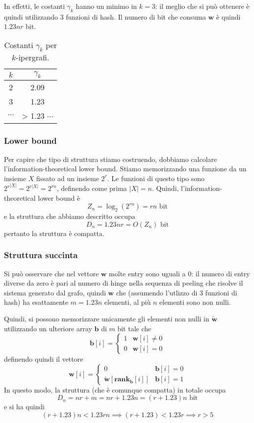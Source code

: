 In effetti, le costanti $\gamma_k$ hanno un minimo in $k = 3$: il meglio che si può 
ottenere è quindi utilizzando $3$ funzioni di hash. Il numero di bit che consuma 
$\mathbf{w}$ è quindi $1.23nr$ bit.  

\begin{table}[htpb]
    \centering
    \begin{tabular}{c|c}
	 $k$ &  $\gamma_k$ \\ 
	 \hline 
	 2 & 2.09 \\
	 3 & 1.23 \\
	 $\cdots$ & > 1.23 $\cdots$
    \end{tabular}
    \caption{Costanti $\gamma_k$ per $k$-ipergrafi.}
    \label{tab:gamma_k_hypergraph}
\end{table}

\subsubsection{Lower bound}
Per capire che tipo di struttura stiamo costruendo, dobbiamo calcolare l'information-theoretical 
lower bound. Stiamo memorizzando una funzione da un insieme $X$ fissato ad un insieme $2^r$.  
Le funzioni di questo tipo sono ${2^{r}}^{|X|} = 2^{r|X|} = 2^{rn}$, definendo come prima $|X| = n$. 
Quindi, l'information-theoretical lower bound è 
$$
Z_n = \log_2(2^{rn}) = rn \text{ bit}
$$
e la struttura che abbiamo descritto occupa 
$$
D_n = 1.23nr = O(Z_n) \text{ bit}
$$
pertanto la struttura è compatta.

\subsubsection{Struttura succinta}
Si può osservare che nel vettore $\mathbf{w}$ molte entry sono uguali a $0$: il numero 
di entry diverse da zero è pari al numero di hinge nella sequenza di peeling 
che risolve il sistema generato dal grafo, quindi $\mathbf{w}$ che (assumendo 
l'utlizzo di $3$ funzioni di hash) ha esattamente $m = 1.23n$ elementi, al più
$n$ elementi sono non nulli. 

Quindi, si possono memorizzare unicamente gli elementi non nulli in $\tilde{\mathbf{w}}$ 
utilizzando un ulteriore array $\mathbf{b}$ di $m$ bit tale che 
$$
\mathbf{b}[i] = \begin{cases}
    1 & \mathbf{w}[i] \neq 0 \\
    0 & \mathbf{w}[i] = 0
\end{cases}
$$
definendo quindi il vettore 
$$
\mathbf{w}[i] = \begin{cases}
    0 & \mathbf{b}[i] = 0 \\
    \tilde{\mathbf{w}}[\mathbf{rank_b}[i]] & \mathbf{b}[i] = 1
\end{cases}
$$
In questo modo, la struttura (che è comunque compatta) in totale occupa 
$$
D_n = nr + m = nr + 1.23n = (r + 1.23) n \text{ bit}
$$
e si ha quindi 
$$
(r + 1.23 ) n < 1.23rn \implies (r + 1.23) < 1.23r  \implies r > 5
$$

